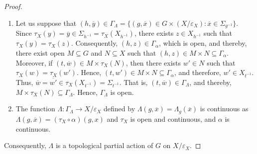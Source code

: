\documentclass[sn-mathphys-num]{sn-jnl}%
\theoremstyle{thmstyleone}%
\theoremstyle{thmstyletwo}%
\theoremstyle{thmstylethree}%
\begin{document}
\begin{proof}
\begin{enumerate}
\item Let us suppose that $ (h, \overline{y}) \in \Gamma_{\Lambda} = \{(g,\overline{x}) \in G \times (X / \varepsilon_X): \overline{x} \in \Sigma_{g^{-1}} \} $. Since $\tau_X(y)=\overline{y} \in \Sigma_{h^{-1}}=\tau_X(X_{h^{-1}})$, there exists $z\in X_{h^{-1}}$ such that $\tau_X(y)=\tau_X(z)$. Consequently, $(h, z) \in \Gamma_\alpha$, which is open, and thereby, there exist open $ M \subseteq G $ and $ N \subseteq X $ such that $ (h, z) \in M\times N \subseteq \Gamma_\alpha $. Moreover, if $(t,\overline{w})\in M \times \tau_X (N)$, then there exists $w'\in N$ such that $\tau_X(w)=\tau_X(w')$. Hence,  $(t,w')\in M\times N \subseteq \Gamma_{\alpha}$, and  
therefore, $w'\in X_{t^{-1}}$. Thus, $\overline{w}=\overline{w'}\in \tau_X(X_{t^{-1}})=\Sigma_{t^{-1}}$. That is, $(t,\overline{w})\in \Gamma_{\Lambda}$, and thereby, $ M \times \tau_X (N) \subseteq \Gamma_{\Lambda}$. Hence, $\Gamma_\Lambda$ is open.
\item The function $ \Lambda: \Gamma_\Lambda \to X / \varepsilon_X $ defined by $ \Lambda (g, \overline {x}) = \Lambda_g (\overline {x}) $ is continuous as $ \Lambda (g, \overline {x}) = (\tau_X \circ \alpha) (g, x) $ and  $ \tau_X $ is open and continuous, and $ \alpha $ is continuous.
\end{enumerate}
Consequently, $ \Lambda $ is a topological partial action of $ G $ on $ X / \varepsilon_X $.
\end{proof}
\end{document}
